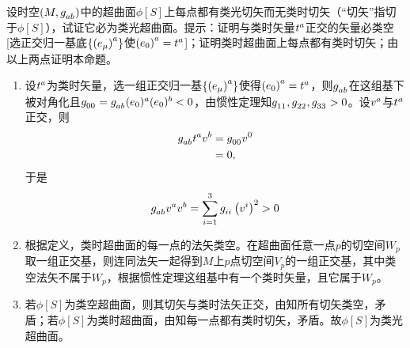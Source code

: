 \begin{xiti}
	\item 设时空$\left(M,\tensor{g}{_a_b}\right)$中的超曲面$\phi[S]$上每点都有类光切矢而无类时切矢（“切矢”指切于$\phi[S]$），试证它必为类光超曲面。提示：证明与类时矢量$\tensor{t}{^a}$正交的矢量必类空[选正交归一基底$\{ \tensor{\left(e_\mu\right)}{^a} \}$使$ \tensor{\left(e_0\right)}{^a}= \tensor{t}{^a} $]；证明类时超曲面上每点都有类时切矢；由以上两点证明本命题。

	\begin{zm}
		\begin{enumerate}
			\item[\circled{1}] 设$\tensor{t}{^a} $为类时矢量，选一组正交归一基$ \{ \tensor{\left(e_\mu\right)}{^a} \} $使得$ \tensor{\left(e_0\right)}{^a}=\tensor{t}{^a} $，则$\tensor{g}{_a_b} $在这组基下被对角化且$\tensor{g}{_0_0}= \tensor{g}{_a_b} \tensor{(e_0)}{^a} \tensor{(e_0)}{^b} <0 $，由惯性定理知$\tensor{g}{_1_1},\tensor{g}{_2_2} , \tensor{g}{_3_3}>0 $。设$\tensor{v}{^a} $与$ \tensor{t}{^a} $正交，则
			\begin{align*}
			\tensor{g}{_a_b} \tensor{t}{^a} \tensor{v}{^b} &= \tensor{g}{_0_0} \tensor{v}{^0}\\
			&=0,
			\end{align*}
			于是
			\begin{equation*}
			\tensor{g}{_a_b} \tensor{v}{^a} \tensor{v}{^b} = \sum_{i=1}^{3} \tensor{g}{_i_i} \left(\tensor{v}{^i}\right)^2>0
			\end{equation*}
			\item[\circled{2}] 根据定义，类时超曲面的每一点的法矢类空。在超曲面任意一点$p$的切空间$W_p $取一组正交基，则连同法矢一起得到$M$上$p$点切空间$V_p$的一组正交基，其中类空法矢不属于$W_p$，根据惯性定理这组基中有一个类时矢量，且它属于$W_p$。
			\item[\circled{3}] 若$\phi[S] $为类空超曲面，则其切矢与类时法矢正交，由知所有切矢类空，矛盾；若$\phi[S] $为类时超曲面，由知每一点都有类时切矢，矛盾。故$\phi[S] $为类光超曲面。
		\end{enumerate}
	\end{zm}
\end{xiti}
